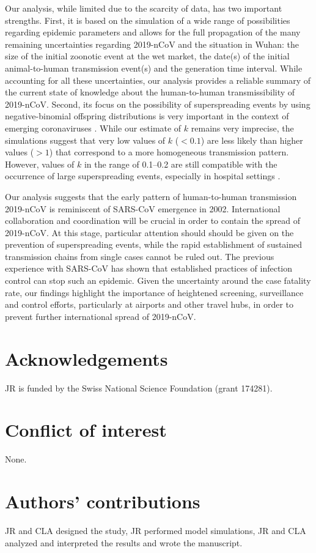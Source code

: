 \documentclass[a4]{article}
\begin{document}
Our analysis, while limited due to the scarcity of data, has two important strengths.
First, it is based on the simulation of a wide range of possibilities regarding epidemic parameters and allows for the full propagation of the many remaining uncertainties regarding 2019-nCoV and the situation in Wuhan: the size of the initial zoonotic event at the wet market, the date(s) of the initial animal-to-human transmission event(s) and the generation time interval.
While accounting for all these uncertainties, our analysis provides a reliable summary of the current state of knowledge about the human-to-human transmissibility of 2019-nCoV.
Second, its focus on the possibility of superspreading events by using negative-binomial offspring distributions is very important in the context of emerging coronaviruses \cite{Lloyd-Smith:2005,Althaus:2015b}.
While our estimate of $k$ remains very imprecise, the simulations suggest that very low values of $k$ ($< 0.1$) are less likely than higher values ($> 1$) that correspond to a more homogeneous transmission pattern.
However, values of $k$ in the range of 0.1--0.2 are still compatible with the occurrence of large superspreading events, especially in hospital settings \cite{oh2015middle,assiri2013hospital}.

Our analysis suggests that the early pattern of human-to-human transmission 2019-nCoV is reminiscent of SARS-CoV emergence in 2002.
International collaboration and coordination will be crucial in order to contain the spread of 2019-nCoV.
At this stage, particular attention should should be given on the prevention of superspreading events, while the rapid establishment of sustained transmission chains from single cases cannot be ruled out.
The previous experience with SARS-CoV has shown that established practices of infection control can stop such an epidemic.
Given the uncertainty around the case fatality rate, our findings highlight the importance of heightened screening, surveillance and control efforts, particularly at airports and other travel hubs, in order to prevent further international spread of 2019-nCoV.



\section*{Acknowledgements}
JR is funded by the Swiss National Science Foundation (grant 174281).
\section*{Conflict of interest}
None.

\section*{Authors' contributions}

JR and CLA designed the study, JR performed model simulations, JR and CLA analyzed and interpreted the results and wrote the manuscript.


  
\end{document}
